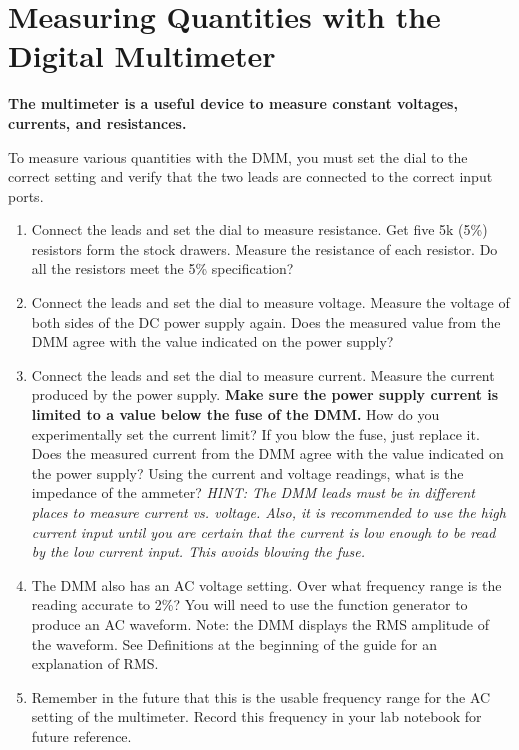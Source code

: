 \documentclass[10pt]{PhysLab1C} %
\begin{document}

\section{Measuring Quantities with the Digital Multimeter}

\textbf{The multimeter is a useful device to measure constant voltages,
currents, and resistances.}

To measure various quantities with the DMM, you must set the dial to the
correct setting and verify that the two leads are connected to the
correct input ports.

\begin{enumerate}
\def\labelenumi{\arabic{enumi}.}
\item
  Connect the leads and set the dial to measure resistance. Get five 5k
  (5\%) resistors form the stock drawers. Measure the resistance of each
  resistor. Do all the resistors meet the 5\% specification?
\item
  Connect the leads and set the dial to measure voltage. Measure the
  voltage of both sides of the DC power supply again. Does the measured
  value from the DMM agree with the value indicated on the power supply?
\item
  Connect the leads and set the dial to measure current. Measure the
  current produced by the power supply. \textbf{Make sure the power
  supply current is limited to a value below the fuse of the DMM.} How
  do you experimentally set the current limit? If you blow the fuse,
  just replace it. Does the measured current from the DMM agree with the
  value indicated on the power supply? Using the current and voltage
  readings, what is the impedance of the ammeter? \emph{HINT: The DMM
  leads must be in different places to measure current vs. voltage.
  Also, it is recommended to use the high current input until you are
  certain that the current is low enough to be read by the low current
  input. This avoids blowing the fuse.}
\item
  The DMM also has an AC voltage setting. Over what frequency range is
  the reading accurate to 2\%? You will need to use the function
  generator to produce an AC waveform. Note: the DMM displays the RMS
  amplitude of the waveform. See Definitions at the beginning of the
  guide for an explanation of RMS.
\item
  Remember in the future that this is the usable frequency range for the
  AC setting of the multimeter. Record this frequency in your lab
  notebook for future reference.
\end{enumerate}
\end{document}
